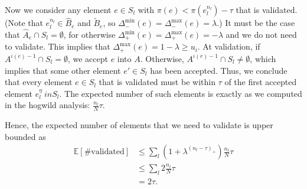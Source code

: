 Now we consider any element $e \in S_l$ with $\pi(e) < \pi(e_l^{n_l}) - \tau$ that is validated.
(Note that $e_l^{n_l} \in \hat{B}_e$ and $\tilde{B}_e$, so $\Delta_-^{\min}(e) = \Delta_-^{\max}(e) = \lambda$.)
It must be the case that $\hat{A}_e \cap S_l = \emptyset$, for otherwise $\Delta_+^{\min}(e) = \Delta_+^{\max}(e) = -\lambda$ and we do not need to validate.
This implies that $\Delta_+^{\max}(e) = 1-\lambda \geq u_i$.
At validation, if $A^{\iota(e)-1} \cap S_l = \emptyset$, we accept $e$ into $A$.
Otherwise, $A^{\iota(e)-1} \cap S_l \neq \emptyset$, which implies that some other element $e' \in S_l$ has been accepted.
Thus, we conclude that every element $e\in S_l$ that is validated must be within $\tau$ of the first accepted element $e_l^\eta \ in S_l$.
The expected number of such elements is exactly as we computed in the hogwild analysis: $\frac{n_l}{N}\tau$.

Hence, the expected number of elements that we need to validate is upper bounded as
\begin{align*}
\mathbb{E}[\#\text{validated}]
&\leq \sum_l (1+\lambda^{(n_l-\tau)_+}) \frac{n_l}{N} \tau\\
&\leq \sum_l 2\frac{n_l}{N} \tau\\
&= 2\tau.
\end{align*}




